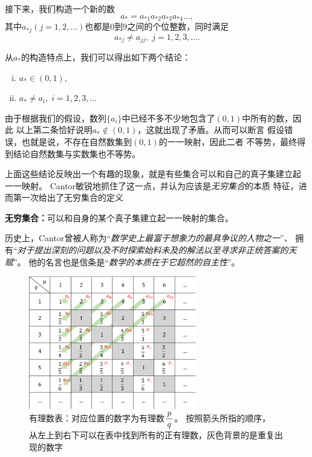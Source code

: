 \begin{shaded}
	接下来，我们构造一个新的数
	$$a_*=a_{*1}a_{*2}a_{*3}a_{*4}\ldots,$$
	其中$a_{*j}(j=1,2,\ldots)$也都是$0$到$9$之间的个位整数，同时满足
	$$a_{*j}\ne a_{jj},\; j=1,2,3,\ldots.$$
	
	从$a_*$的构造特点上，我们可以得出如下两个结论：
	\begin{enumerate}[(i)]
	  \setlength{\itemindent}{1cm}
	  \item $a_*\in(0,1)$,
	  \item $a_*\ne a_i,\;i=1,2,3,\ldots$
	\end{enumerate}
	由于根据我们的假设，数列$\{a_i\}$中已经不多不少地包含了$(0,1)$中所有的数，因此
	以上第二条恰好说明$a_*\notin(0,1)$，这就出现了矛盾。从而可以断言
	假设错误，也就是说，不存在自然数集到$(0,1)$的一一映射，因此二者
	不等势，最终得到结论自然数集与实数集也不等势。\fin 
	
	\bs
	上面这些结论反映出一个有趣的现象，就是有些集合可以和自己的真子集建立起
	一一映射。	Cantor敏锐地抓住了这一点，并认为应该是{\it 无穷集合}的本质
	特征，进而第一次给出了无穷集合的定义
	\begin{tcolorbox}
		{\bf 无穷集合：}可以和自身的某个真子集建立起一一映射的集合。
	\end{tcolorbox}
	历史上，Cantor曾被人称为“{\it 数学史上最富于想象力的最具争议的人物之一}”、
	拥有“{\it 对于提出深刻的问题以及不时探索始料未及的解法以至寻求非正统答案的天赋}”。
	他的名言也是信条是“{\it 数学的本质在于它超然的自主性}”。
\end{shaded}	

\begin{figure}[tbp]
	\centering
	\includegraphics[width=0.65\textwidth]{./Images/Ch01/Q-Counting.pdf}
	\caption{有理数表：对应位置的数字为有理数$\displaystyle\frac{\,{p}\,}{\,{q}\,}$。
	按照箭头所指的顺序，\\
	从左上到右下可以在表中找到所有的正有理数，灰色背景的是重复出现的数字}
	\label{fig:1-2}
\end{figure}

